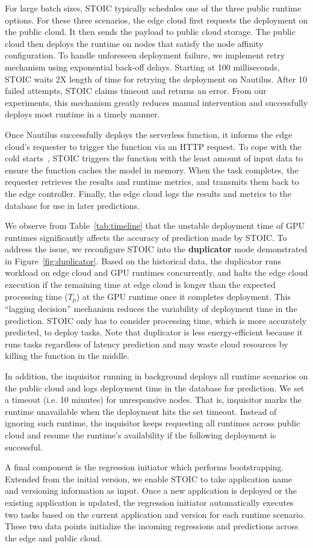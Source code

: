 For large batch sizes, STOIC typically schedules one of the three public runtime options. For these three scenarios, the edge cloud first requests the deployment on the public cloud. It then sends the payload to public cloud storage. The public cloud then deploys the runtime on nodes that satisfy the node affinity configuration. To handle unforeseen deployment failure, we implement retry mechanism using exponential back-off delays. Starting at 100 milliseconds, STOIC waits 2X length of time for retrying the deployment on Nautilus. After 10 failed attempts, STOIC claims timeout and returns an error. From our experiments, this mechanism greatly reduces manual intervention and successfully deploys most runtime in a timely manner.
 
Once Nautilus successfully deploys the serverless function, it informs the edge cloud's requester to trigger the function via an HTTP request. To cope with the cold starts~\cite{ref:coldstart}, STOIC triggers the function with the least amount of input data to ensure the function caches the model in memory. When the task completes, the requester retrieves the results and runtime metrics, and transmits them back to the edge controller. Finally, the edge cloud logs the results and metrics to the database for use in later predictions. 

We observe from Table~\ref{tab:timeline} that the unstable deployment time of GPU runtimes significantly affects the accuracy of prediction made by STOIC. To address the issue, we reconfigure STOIC into the \textbf{duplicator} mode demonstrated in Figure~\ref{fig:duplicator}. Based on the historical data, the duplicator runs workload on edge cloud and GPU runtimes concurrently, and halts the edge cloud execution if the remaining time at edge cloud is longer than the expected processing time ($T_p$) at the GPU runtime once it completes deployment. This ``lagging decision'' mechanism reduces the variability of deployment time in the prediction. STOIC only has to consider processing time, which is more accurately predicted, to deploy tasks. Note that duplicator is less energy-efficient because it runs tasks regardless of latency prediction and may waste cloud resources by killing the function in the middle. 

In addition, the inquisitor running in background deploys all runtime scenarios on the public cloud and logs deployment time in the database for prediction. We set a timeout (i.e. 10 minutes) for unresponsive nodes. That is, inquisitor marks the runtime unavailable when the deployment hits the set timeout. Instead of ignoring such runtime, the inquisitor keeps requesting all runtimes across public cloud and resume the runtime's availability if the following deployment is successful.

A final component is the regression initiator which performs bootstrapping. Extended from the initial version, we enable STOIC to take application name and versioning information as input. Once a new application is deployed or the existing application is updated, the regression initiator automatically executes two tasks based on the current application and version for each runtime scenario. These two data points initialize the incoming regressions and predictions across the edge and public cloud.

